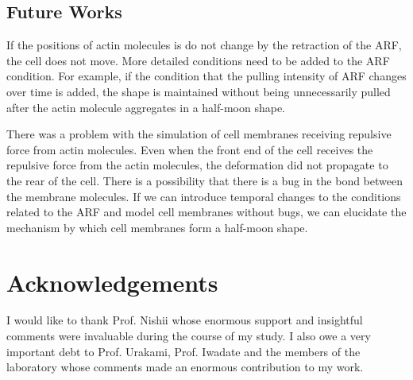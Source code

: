 \documentclass[a4paper,12pt, oneside]{book}
\begin{document}
\section{Future Works}
If the positions of actin molecules is do not change by the retraction of the ARF, the cell does not move.
More detailed conditions need to be added to the ARF condition.
For example, if the condition that the pulling intensity of ARF changes over time is added, the shape is maintained without being unnecessarily pulled after the actin molecule aggregates in a half-moon shape.


There was a problem with the simulation of cell membranes receiving repulsive force from actin molecules.
Even when the front end of the cell receives the repulsive force from the actin molecules, the deformation did not propagate to the rear of the cell.
There is a possibility that there is a bug in the bond between the membrane molecules.
If we can introduce temporal changes to the conditions related to the ARF and model cell membranes without bugs, we can elucidate the mechanism by which cell membranes form a half-moon shape.

\chapter*{Acknowledgements}
I would like to thank Prof. Nishii whose enormous support and insightful comments were invaluable during the course of my study. I also owe a very important debt to Prof. Urakami, Prof. Iwadate and the members of the laboratory whose comments made an enormous contribution to my work. 




\end{document}
